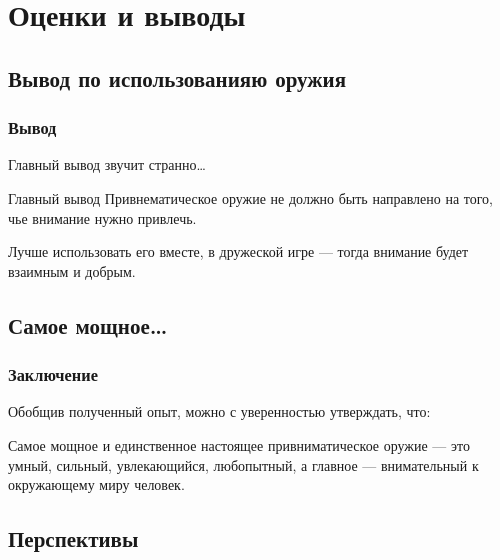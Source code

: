 \section{Оценки и выводы}


\subsection{Вывод по использованияю оружия}

\begin{frame}
    \frametitle{Вывод}
    
    Главный вывод звучит странно\ldots 
    
    \begin{block}{Главный вывод}
        Привнематическое оружие \alert{не должно} быть направлено на того, чье внимание нужно привлечь. 
    \end{block}
    
    \par\bigskip
    
    Лучше использовать его вместе, в дружеской игре --- тогда внимание будет \alert{взаимным} и \alert{добрым}.
\end{frame}


\subsection{Самое мощное\ldots}

\begin{frame}
    \frametitle{Заключение}
    
    Обобщив полученный опыт, можно с уверенностью утверждать, что:
    
    \begin{block}{}
        Самое мощное и \alert{единственное настоящее} привниматическое оружие --- это умный, сильный, увлекающийся, любопытный, а главное --- \alert{внимательный к окружающему миру} человек.
    \end{block}
\end{frame}

    
\subsection{Перспективы}

